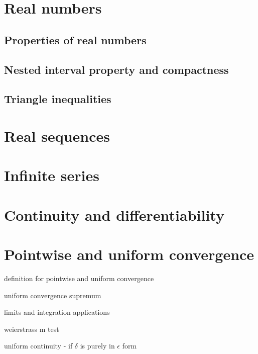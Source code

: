 \documentclass{article}
\begin{document}
\tableofcontents

\newpage

\pagestyle{fancy}
\fancyhead{}

\section{Real numbers}

\subsection{Properties of real numbers}

\subsection{Nested interval property and compactness}
    
\subsection{Triangle inequalities}

\section{Real sequences}

\section{Infinite series}
    
\section{Continuity and differentiability}

\newpage
    
\section{Pointwise and uniform convergence}
definition for pointwise and uniform convergence
    
uniform convergence supremum
    
limits and integration applications
    
weierstrass m test

uniform continuity - if $\delta$ is purely in $\epsilon$ form

\newpage
  
\end{document}
